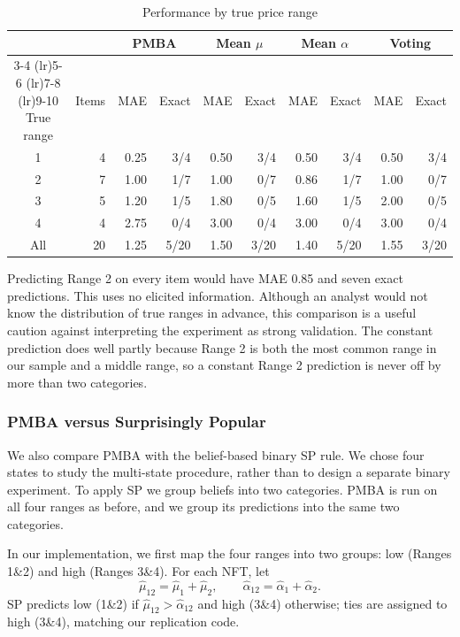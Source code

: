 \documentclass[12pt,reqno]{amsart}
\begin{document}
\begin{table}[htbp]
\centering\small
\caption{Performance by true price range}
\label{tab:true_range}
\setlength{\tabcolsep}{5pt}
\begin{tabular}{crrrrrrrrr}
\toprule
& & \multicolumn{2}{c}{PMBA}
& \multicolumn{2}{c}{Mean $\mu$}
& \multicolumn{2}{c}{Mean $\alpha$}
& \multicolumn{2}{c}{Voting}\\
\cmidrule(lr){3-4}
\cmidrule(lr){5-6}
\cmidrule(lr){7-8}
\cmidrule(lr){9-10}
True range & Items
& MAE & Exact
& MAE & Exact
& MAE & Exact
& MAE & Exact\\
\midrule
1 & 4
& 0.25 & 3/4
& 0.50 & 3/4
& 0.50 & 3/4
& 0.50 & 3/4\\
2 & 7
& 1.00 & 1/7
& 1.00 & 0/7
& 0.86 & 1/7
& 1.00 & 0/7\\
3 & 5
& 1.20 & 1/5
& 1.80 & 0/5
& 1.60 & 1/5
& 2.00 & 0/5\\
4 & 4
& 2.75 & 0/4
& 3.00 & 0/4
& 3.00 & 0/4
& 3.00 & 0/4\\
\midrule
All & 20
& 1.25 & 5/20
& 1.50 & 3/20
& 1.40 & 5/20
& 1.55 & 3/20\\
\bottomrule
\end{tabular}
\end{table}

Predicting Range 2 on every item would have MAE 0.85 and seven exact predictions. This uses no elicited information. Although an analyst would not know the distribution of true ranges in advance, this comparison is a useful caution against interpreting the experiment as strong validation. The constant prediction does well partly because Range 2 is both the most common range in our sample and a middle range, so a constant Range 2 prediction is never off by more than two categories.

\subsubsection{PMBA versus Surprisingly Popular}
We also compare PMBA with the belief-based binary SP rule. We chose four states to study the multi-state procedure, rather than to design a separate binary experiment.  To apply SP we group beliefs into two categories. PMBA is run on all four ranges as before, and we group its predictions into the same two categories.

In our implementation, we first map the four ranges into two groups: low (Ranges 1\&2) and high (Ranges 3\&4). For each NFT, let
\[
\hat{\mu}_{12}=\hat{\mu}_{1}+\hat{\mu}_{2},\qquad
\hat{\alpha}_{12}=\hat{\alpha}_{1}+\hat{\alpha}_{2}.
\]
SP predicts low (1\&2) if $\hat{\mu}_{12}>\hat{\alpha}_{12}$ and high (3\&4) otherwise; ties are assigned to high (3\&4), matching our replication code.
\end{document}
